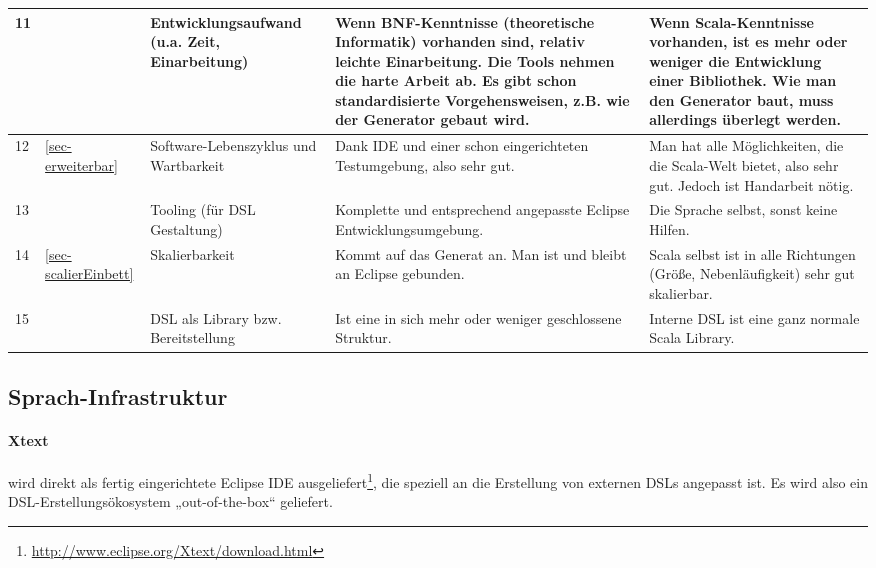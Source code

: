 \begin{landscape}
\begin{longtable}{|p{0.5cm}|p{0.8cm}|p{4.3cm}|p{6.3cm}|p{6.3cm}|}
  11
  &
  & Entwicklungsaufwand (u.a. Zeit, Einarbeitung)
  & {\small Wenn BNF-Kenntnisse (theoretische Informatik) vorhanden sind,
    relativ leichte Einarbeitung.
    Die Tools nehmen die harte Arbeit ab. Es gibt schon standardisierte
    Vorgehensweisen, z.B. wie der Generator gebaut wird.}
  & {\small Wenn Scala-Kenntnisse vorhanden, ist es mehr oder weniger die Entwicklung
    einer Bibliothek.
    Wie man den Generator baut, muss allerdings überlegt werden.}
  \\\hline

  12
  & \ref{sec-erweiterbar}
  & Software-Lebenszyklus und Wartbarkeit
  & {\small Dank IDE und einer schon eingerichteten Testumgebung, also sehr gut.}
  & {\small Man hat alle Möglichkeiten, die die Scala-Welt bietet, also sehr gut.
    Jedoch ist Handarbeit nötig.}
  \\\hline

  13
  &
  & Tooling (für DSL Gestaltung)
  & {\small Komplette und entsprechend angepasste Eclipse Entwicklungsumgebung.}
  & {\small Die Sprache selbst, sonst keine Hilfen.}
  \\\hline

  14
  & \ref{sec-scalierEinbett}
  & Skalierbarkeit
  & {\small Kommt auf das Generat an. Man ist und bleibt an Eclipse gebunden.}
  & {\small Scala selbst ist in alle Richtungen (Größe, Nebenläufigkeit) sehr gut
    skalierbar.}
  \\\hline

  15
  &
  & DSL als Library bzw. Bereitstellung
  & {\small Ist eine in sich mehr oder weniger geschlossene Struktur.}
  & {\small Interne DSL ist eine ganz normale Scala Library.}
  \\\hline

\end{longtable}
\newpage
\end{landscape}


\subsection{Sprach-Infrastruktur}\label{sec-infrastruktur}

\paragraph{Xtext} wird direkt als fertig eingerichtete Eclipse IDE
ausgeliefert\footnote{\url{http://www.eclipse.org/Xtext/download.html}},
die speziell an die Erstellung von externen DSLs angepasst
ist. Es wird also ein DSL-Erstellungsökosystem „out-of-the-box“ geliefert.

